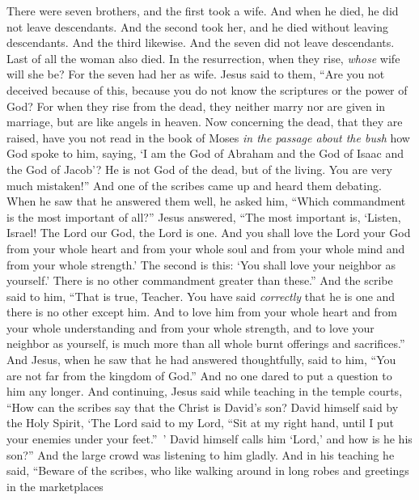 \begin{biblechapter}
\verse There were seven brothers, and the first took a wife. And when he died, he did not leave descendants.
\verse And the second took her, and he died without leaving descendants. And the third likewise.
\verse And the seven did not leave descendants. Last of all the woman also died.
\verse In the resurrection, when they rise, \textit{whose} wife will she be? For the seven had her as wife.
\verse Jesus said to them, “Are you not deceived because of this, because you do not know the scriptures or the power of God?
\verse For when they rise from the dead, they neither marry nor are given in marriage, but are like angels in heaven.
\verse Now concerning the dead, that they are raised, have you not read in the book of Moses \textit{in the passage about the bush} how God spoke to him, saying, ‘I am the God of Abraham and the God of Isaac and the God of Jacob’?
\verse He is not God of the dead, but of the living. You are very much mistaken!”
 And one of the scribes came up and heard them debating. When he saw that he answered them well, he asked him, “Which commandment is the most important of all?”
\verse Jesus answered, “The most important is, ‘Listen, Israel! The Lord our God, the Lord is one.
\verse And you shall love the Lord your God from your whole heart and from your whole soul and from your whole mind and from your whole strength.’
\verse The second is this: ‘You shall love your neighbor as yourself.’ There is no other commandment greater than these.”
\verse And the scribe said to him, “That is true, Teacher. You have said \textit{correctly} that he is one and there is no other except him.
\verse And to love him from your whole heart and from your whole understanding and from your whole strength, and to love your neighbor as yourself, is much more than all whole burnt offerings and sacrifices.”
\verse And Jesus, when he saw that he had answered thoughtfully, said to him, “You are not far from the kingdom of God.” And no one dared to put a question to him any longer.
 And continuing, Jesus said while teaching in the temple courts, “How can the scribes say that the Christ is David’s son?
\verse David himself said by the Holy Spirit, ‘The Lord said to my Lord, 
“Sit at my right hand, 
until I put your enemies 
under your feet.” ’
\verse David himself calls him ‘Lord,’ and how is he his son?” And the large crowd was listening to him gladly.
 And in his teaching he said, “Beware of the scribes, who like walking around in long robes and greetings in the marketplaces

\end{biblechapter}
